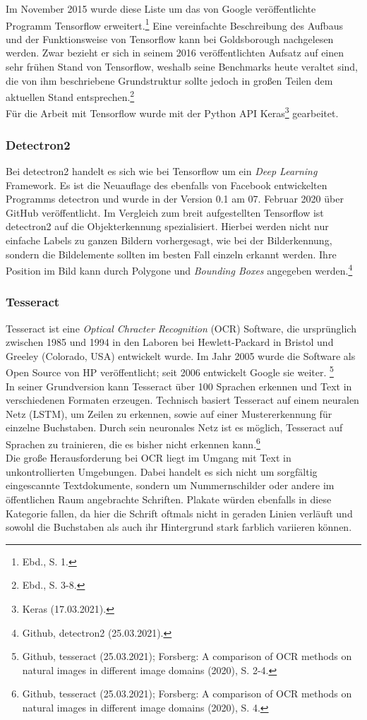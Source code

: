 \documentclass[a4paper,12pt,ngerman]{article}
\begin{document}
Im November 2015 wurde diese Liste um das von Google veröffentlichte Programm Tensorflow erweitert.\footnote{Ebd., S. 1.}  Eine vereinfachte Beschreibung des Aufbaus und der Funktionsweise von Tensorflow kann bei Goldsborough nachgelesen werden. Zwar bezieht er sich in seinem 2016 veröffentlichten Aufsatz auf einen sehr frühen Stand von Tensorflow, weshalb seine Benchmarks heute veraltet sind, die von ihm beschriebene Grundstruktur sollte jedoch in großen Teilen dem aktuellen Stand entsprechen.\footnote{Ebd., S. 3-8.} \\
Für die Arbeit mit Tensorflow wurde mit der Python API Keras\footnote{Keras (17.03.2021).} gearbeitet. \\

\subsubsection{Detectron2}
Bei detectron2 handelt es sich wie bei Tensorflow um ein \textit{Deep Learning} Framework. Es ist die Neuauflage des ebenfalls von Facebook entwickelten Programms detectron und wurde in der Version 0.1 am 07. Februar 2020 über GitHub veröffentlicht. Im Vergleich zum breit aufgestellten Tensorflow ist detectron2 auf die Objekterkennung spezialisiert. Hierbei werden nicht nur einfache Labels zu ganzen Bildern vorhergesagt, wie bei der Bilderkennung, sondern die Bildelemente sollten im besten Fall einzeln erkannt werden. Ihre Position im Bild kann durch Polygone und \textit{Bounding Boxes} angegeben werden.\footnote{Github, detectron2 (25.03.2021).} \\

\subsubsection{Tesseract}
Tesseract ist eine \textit{Optical Chracter Recognition} (OCR) Software, die ursprünglich zwischen 1985 und 1994 in den Laboren bei Hewlett-Packard in Bristol und Greeley (Colorado, USA) entwickelt wurde. Im Jahr 2005 wurde die Software als Open Source von HP veröffentlicht; seit 2006 entwickelt Google sie weiter. \footnote{Github, tesseract (25.03.2021); Forsberg: A comparison of OCR methods on natural images in different image domains (2020), S. 2-4.} \\
In seiner Grundversion kann Tesseract über 100 Sprachen erkennen und Text in verschiedenen Formaten erzeugen. Technisch basiert Tesseract auf einem neuralen Netz (LSTM), um Zeilen zu erkennen, sowie auf einer Mustererkennung für einzelne Buchstaben. Durch sein neuronales Netz ist es möglich, Tesseract auf Sprachen zu trainieren, die es bisher nicht erkennen kann.\footnote{Github, tesseract (25.03.2021); Forsberg: A comparison of OCR methods on natural images in different image domains (2020), S. 4. } \\
Die große Herausforderung bei OCR liegt im Umgang mit Text in unkontrollierten Umgebungen. Dabei handelt es sich nicht um sorgfältig eingescannte Textdokumente, sondern um Nummernschilder oder andere im öffentlichen Raum angebrachte Schriften. Plakate würden ebenfalls in diese Kategorie fallen, da hier die Schrift oftmals nicht in geraden Linien verläuft und sowohl die Buchstaben als auch ihr Hintergrund stark farblich variieren können.
\end{document}

